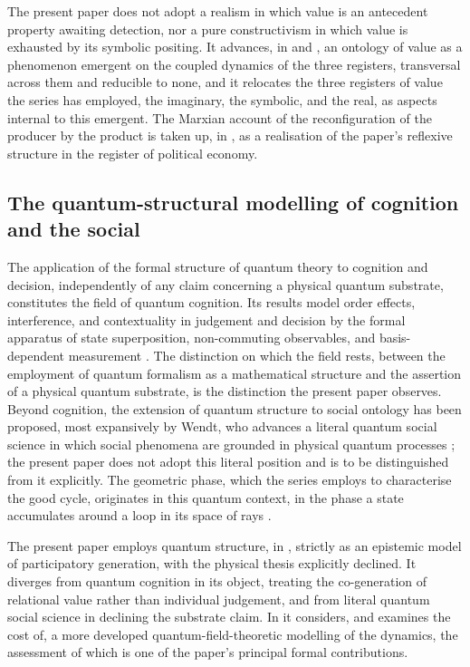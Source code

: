 The present paper does not adopt a realism in which value is an antecedent property awaiting detection, nor a pure constructivism in which value is exhausted by its symbolic positing. It advances, in  and , an ontology of value as a phenomenon emergent on the coupled dynamics of the three registers, transversal across them and reducible to none, and it relocates the three registers of value the series has employed, the imaginary, the symbolic, and the real, as aspects internal to this emergent. The Marxian account of the reconfiguration of the producer by the product is taken up, in , as a realisation of the paper's reflexive structure in the register of political economy.

\subsection{The quantum-structural modelling of cognition and the social}
\label{p10:sec:bg-quantum}

The application of the formal structure of quantum theory to cognition and decision, independently of any claim concerning a physical quantum substrate, constitutes the field of quantum cognition. Its results model order effects, interference, and contextuality in judgement and decision by the formal apparatus of state superposition, non-commuting observables, and basis-dependent measurement \parencite{busemeyer2012,aerts2009}. The distinction on which the field rests, between the employment of quantum formalism as a mathematical structure and the assertion of a physical quantum substrate, is the distinction the present paper observes. Beyond cognition, the extension of quantum structure to social ontology has been proposed, most expansively by Wendt, who advances a literal quantum social science in which social phenomena are grounded in physical quantum processes \parencite{wendt2015}; the present paper does not adopt this literal position and is to be distinguished from it explicitly. The geometric phase, which the series employs to characterise the good cycle, originates in this quantum context, in the phase a state accumulates around a loop in its space of rays \parencite{berry1984,pancharatnam1956,aharonov1987}.

The present paper employs quantum structure, in , strictly as an epistemic model of participatory generation, with the physical thesis explicitly declined. It diverges from quantum cognition in its object, treating the co-generation of relational value rather than individual judgement, and from literal quantum social science in declining the substrate claim. In  it considers, and examines the cost of, a more developed quantum-field-theoretic modelling of the dynamics, the assessment of which is one of the paper's principal formal contributions.

